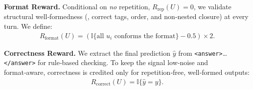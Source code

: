 \noindent\textbf{Format Reward.}
Conditional on \emph{no} repetition, $R_{\text{rep}}(U){=}0$, we validate structural well‑formedness (\eg, correct tags, order, and non‑nested closure) at every turn. We define:
\begin{equation*}
    \begin{aligned}
        R_{\text{format}}(U)=(\mathbb{I}\{\text{all $u_i$ conforms the format}\}-0.5)\times2.
    \end{aligned}
\end{equation*}




\noindent\textbf{Correctness Reward.}
We extract the final prediction $\hat{y}$ from \texttt{<answer>}…\texttt{</answer>} for rule‑based checking. To keep the signal low‑noise and format‑aware, correctness is credited only for repetition‑free, well‑formed outputs:
\begin{equation*}
    \begin{aligned}
        R_{\text{correct}}(U)=\mathbb{I}\{\hat{y}=y\}.
    \end{aligned}
\end{equation*}

